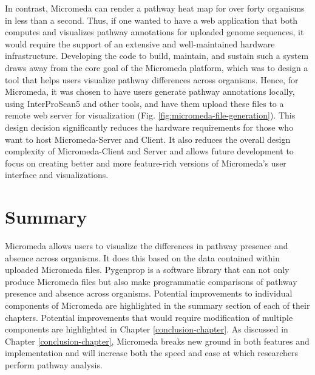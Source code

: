 In contrast, Micromeda can render a pathway heat map for over forty organisms in less than a second. Thus, if one wanted to have a web application that both computes and visualizes pathway annotations for uploaded genome sequences, it would require the support of an extensive and well-maintained hardware infrastructure. Developing the code to build, maintain, and sustain such a system draws away from the core goal of the Micromeda platform, which was to design a tool that helps users visualize pathway differences across organisms. Hence, for Micromeda, it was chosen to have users generate pathway annotations locally, using InterProScan5 and other tools, and have them upload these files to a remote web server for visualization (Fig. \ref{fig:micromeda-file-generation}). This design decision significantly reduces the hardware requirements for those who want to host Micromeda-Server and Client. It also reduces the overall design complexity of Micromeda-Client and Server and allows future development to focus on creating better and more feature-rich versions of Micromeda's user interface and visualizations.

\section{Summary} \label{introduction_summary}

Micromeda allows users to visualize the differences in pathway presence and absence across organisms. It does this based on the data contained within uploaded Micromeda files. Pygenprop is a software library that can not only produce Micromeda files but also make programmatic comparisons of pathway presence and absence across organisms. Potential improvements to individual components of Micromeda are highlighted in the summary section of each of their chapters. Potential improvements that would require modification of multiple components are highlighted in Chapter \ref{conclusion-chapter}. As discussed in Chapter \ref{conclusion-chapter}, Micromeda breaks new ground in both features and implementation and will increase both the speed and ease at which researchers perform pathway analysis.